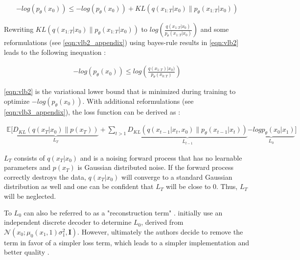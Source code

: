 \begin{equation}
  \label{eqn:vlb_b}
  \begin{align*}
    -log(p_\theta(x_0)) \leq -log(p_\theta(x_0)) + KL(q(x_{1:T}|x_0) \parallel p_\theta(x_{1:T}|x_0))
  \end{align*}
\end{equation}


Rewriting $KL(q(x_{1:T}|x_0) \parallel p_\theta(x_{1:T}|x_0))$ to $log(\frac{q(x_{1:T}|x_0)}{p_\theta(x_{1:T}|x_0)})$ and some reformulations (see \autoref{eqn:vlb2_appendix}) using bayes-rule results in \autoref{eqn:vlb2} leads to the following inequation \cite{ho2020DenoisingDiffusionProbabilistic}:

\begin{equation}
  \label{eqn:vlb2}
  \begin{align*}
    -log(p_\theta(x_0)) \leq log(\frac{q(x_{1:T})|x_0)}{p_\theta(x_{0:T})})
  \end{align*}
\end{equation}

\autoref{eqn:vlb2} is the variational lower bound that is minimized during training to optimize $-log(p_\theta(x_0))$.
With additional reformulations (see \autoref{eqn:vlb3_appendix}), the loss function can be derived as \cite{ho2020DenoisingDiffusionProbabilistic}:


\begin{equation}
  \label{eqn:vlb3}
  \begin{align*}
   \mathbb{E}\biggl[\underbrace{D_{KL}(q(x_{T}|x_0) \parallel p(x_T))}_{L_T} + \sum_{t>1}^{} \underbrace{  D_{KL}(q(x_{t-1}|x_t,x_0) \parallel p_\theta(x_{t-1}|x_t)) }_{L_{t-1}}  \underbrace{ -log p_\theta(x_0|x_1) }_{L_{0}}\biggr]
  \end{align*}
\end{equation}

$L_T$ consists of $q(x_{T}|x_0)$ and is a noising forward process that has no learnable parameters and $p(x_T)$ is Gaussian distributed noise.
If the forward process correctly destroys the data, $q(x_{T}|x_0)$ will converge to a standard Gaussian distribution as well and one can be confident that $L_T$ will be close to $0$.
Thus, $L_T$ will be neglected.

To $L_{0}$ can also be referred to as a "reconstruction term" \cite[p. 10]{luo2022UnderstandingDiffusionModels}.
\textcite{ho2020DenoisingDiffusionProbabilistic} initially use an independent discrete decoder to determine $L_{0}$, derived from $\mathcal{N}(x_0;\mu_0(x_1,1)\sigma^2_1,\textbf{I})$.
However, ultimately the authors decide to remove the term in favor of a simpler loss term, which leads to a simpler implementation and better quality \cite{ho2020DenoisingDiffusionProbabilistic}.

